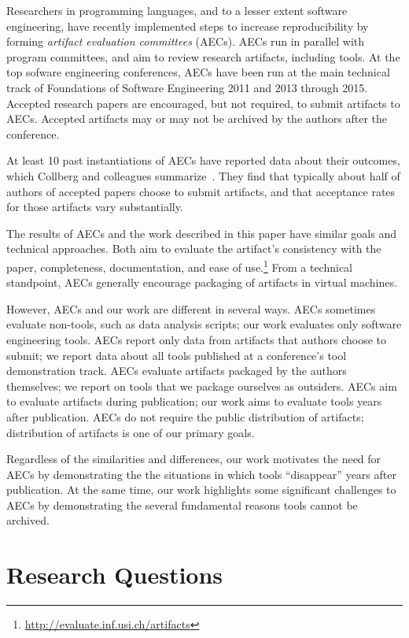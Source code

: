 \documentclass[10pt,conference]{IEEEtran}
\begin{document}
Researchers in programming languages, and to a lesser extent
software engineering, have recently implemented steps
to increase reproducibility by forming
\emph{artifact evaluation committees} (AECs).
AECs run in parallel with program committees,
and aim to review research artifacts, including tools.
At the top sofware engineering conferences,
AECs have been run at the main technical track of 
Foundations of Software Engineering 2011 and 2013 through 2015.
Accepted research papers are encouraged, but not required, to 
submit artifacts to AECs.
Accepted artifacts may or may not be archived by 
the authors after the conference.

At least 10 past instantiations of AECs have reported data about 
their outcomes, which Collberg and colleagues summarize~\cite{proebsting2015repeatability}.
They find that typically about half of authors of accepted papers
choose to submit artifacts, and that acceptance rates for those
artifacts vary substantially.

The results of AECs and the work described
in this paper have similar goals and technical
approaches.
Both aim to evaluate the artifact's 
consistency with the paper,
completeness,
documentation,
and ease of use.\footnote{\url{http://evaluate.inf.usi.ch/artifacts}}
From a technical standpoint, AECs generally  
encourage packaging of artifacts in virtual machines.

However, AECs and our work are different in several
ways.
AECs sometimes evaluate non-tools, such as data analysis scripts; 
our work evaluates only software engineering tools.
AECs report only data from artifacts that authors choose to submit;
we report data about all tools published at a 
conference's tool demonstration track.
AECs evaluate artifacts packaged by the authors themselves;
we report on tools that we package ourselves as outsiders.
AECs aim to evaluate artifacts during publication;
our work aims to evaluate tools years after publication.
AECs do not require the public distribution of artifacts;
distribution of artifacts is one of our primary goals.

Regardless of the similarities and differences,
our work motivates the need for AECs by demonstrating
the the situations in which tools ``disappear'' years
after publication.
At the same time, our work highlights some significant
challenges to AECs by demonstrating the several
fundamental reasons tools cannot be archived. 


\section{Research Questions}
\end{document}

